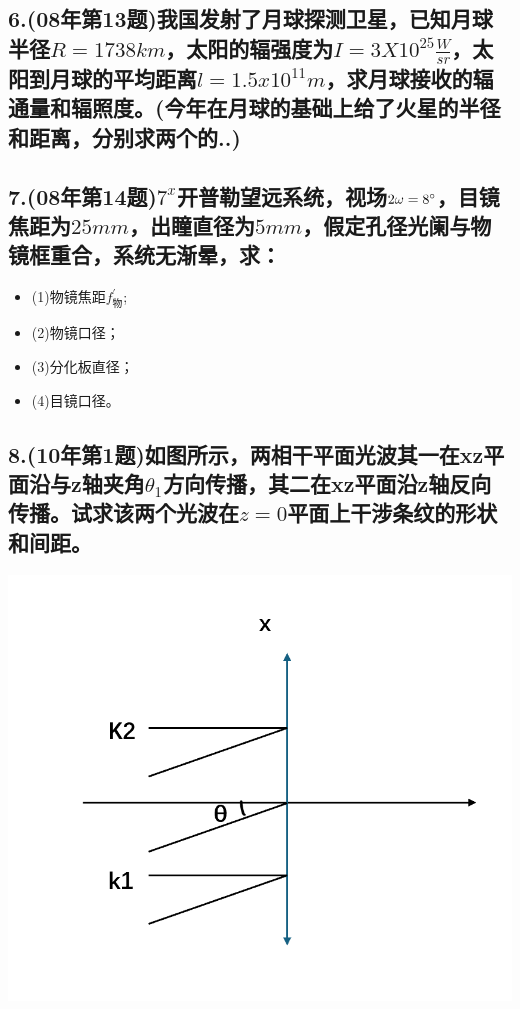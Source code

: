 \documentclass[11pt,a4paper]{article}
\begin{document}
    \subsection*{6.(08年第13题)我国发射了月球探测卫星，已知月球半径$R=1738km$，太阳的辐强度为$I=3X10^{25}\frac{W}{sr}$，太阳到月球的平均距离$l=1.5x10^11m$，求月球接收的辐通量和辐照度。(今年在月球的基础上给了火星的半径和距离，分别求两个的..)}
    \vspace{20mm}
    \subsection*{7.(08年第14题)$7^{x}$开普勒望远系统，视场$2\omega =8\degree$，目镜焦距为$25mm$，出瞳直径为$5mm$，假定孔径光阑与物镜框重合，系统无渐晕，求：}
    \begin{itemize}
        \vspace{-3mm}
        \item (1)物镜焦距$f_{物}^{'}$;
        \vspace{-3mm}
        \item (2)物镜口径；
        \vspace{-3mm}
        \item (3)分化板直径；
        \vspace{-3mm}
        \item (4)目镜口径。
    \end{itemize}
    \subsection*{8.(10年第1题)如图所示，两相干平面光波其一在xz平面沿与z轴夹角$\theta_1$方向传播，其二在xz平面沿z轴反向传播。试求该两个光波在$z=0$平面上干涉条纹的形状和间距。}
    \includegraphics[scale=0.2]{5.png}
    \vspace{15mm}
\end{document}

